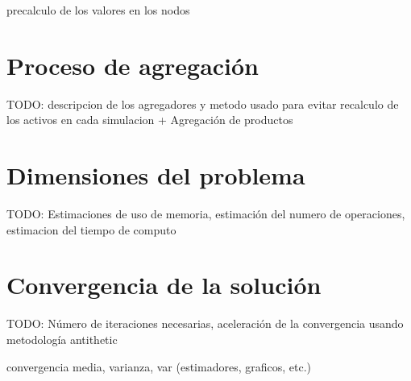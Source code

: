 precalculo de los valores en los nodos


\section{Proceso de agregaci\'on}

TODO: descripcion de los agregadores y metodo usado para evitar recalculo 
de los activos en cada simulacion + Agregaci\'on de productos


\section{Dimensiones del problema}

TODO: Estimaciones de uso de memoria, estimaci\'on del numero de operaciones,
estimacion del tiempo de computo


\section{Convergencia de la soluci\'on}

TODO: N\'umero de iteraciones necesarias, aceleraci\'on de la convergencia
usando metodolog\'ia antithetic

convergencia media, varianza, var (estimadores, graficos, etc.)
